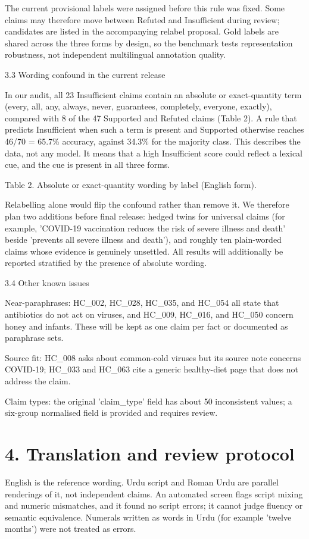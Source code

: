 \documentclass[10pt,a4paper]{article}
\begin{document}
The current provisional labels were assigned before this rule was fixed. Some claims may therefore move between Refuted and Insufficient during review; candidates are listed in the accompanying relabel proposal. Gold labels are shared across the three forms by design, so the benchmark tests representation robustness, not independent multilingual annotation quality.

3.3 Wording confound in the current release

In our audit, all 23 Insufficient claims contain an absolute or exact-quantity term (every, all, any, always, never, guarantees, completely, everyone, exactly), compared with 8 of the 47 Supported and Refuted claims (Table 2). A rule that predicts Insufficient when such a term is present and Supported otherwise reaches 46/70 = 65.7\% accuracy, against 34.3\% for the majority class. This describes the data, not any model. It means that a high Insufficient score could reflect a lexical cue, and the cue is present in all three forms.

Table 2. Absolute or exact-quantity wording by label (English form).

Relabelling alone would flip the confound rather than remove it. We therefore plan two additions before final release: hedged twins for universal claims (for example, 'COVID-19 vaccination reduces the risk of severe illness and death' beside 'prevents all severe illness and death'), and roughly ten plain-worded claims whose evidence is genuinely unsettled. All results will additionally be reported stratified by the presence of absolute wording.

3.4 Other known issues

Near-paraphrases: HC\_002, HC\_028, HC\_035, and HC\_054 all state that antibiotics do not act on viruses, and HC\_009, HC\_016, and HC\_050 concern honey and infants. These will be kept as one claim per fact or documented as paraphrase sets.

Source fit: HC\_008 asks about common-cold viruses but its source note concerns COVID-19; HC\_033 and HC\_063 cite a generic healthy-diet page that does not address the claim.

Claim types: the original 'claim\_type' field has about 50 inconsistent values; a six-group normalised field is provided and requires review.

\section{4. Translation and review protocol}
English is the reference wording. Urdu script and Roman Urdu are parallel renderings of it, not independent claims. An automated screen flags script mixing and numeric mismatches, and it found no script errors; it cannot judge fluency or semantic equivalence. Numerals written as words in Urdu (for example 'twelve months') were not treated as errors.
\end{document}
